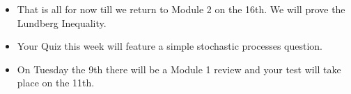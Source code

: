 \documentclass[11pt]{beamer}
\begin{document}
\begin{frame}

\begin{itemize}

\item That is all for now till we return to Module 2 on the 16th. We will prove the Lundberg Inequality. 

\vfill

\item Your Quiz this week will feature a simple stochastic processes question. 

\vfill

\item On Tuesday the 9th there will be a Module 1 review and your test will take place on the 11th.

\end{itemize}

\end{frame}
\end{document}
